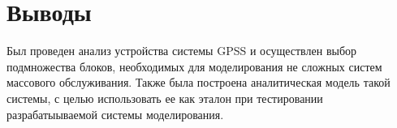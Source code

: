 \section{Выводы}

Был проведен анализ устройства системы GPSS и осуществлен выбор подмножества блоков, необходимых для моделирования не сложных систем массового обслуживания. Также была построена аналитическая модель такой системы, с целью использовать ее как эталон при тестировании разрабатыываемой системы моделирования.
